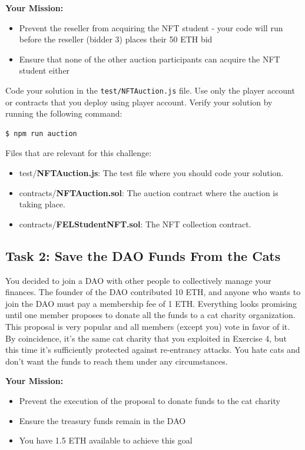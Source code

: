 \documentclass[12pt]{article}
\begin{document}
\medskip
\noindent
\textbf{Your Mission:}
\begin{itemize}
    \item Prevent the reseller from acquiring the NFT student - your code will run before the reseller (bidder 3) places their 50 ETH bid
    \item Ensure that none of the other auction participants can acquire the NFT student either
\end{itemize}

\noindent
Code your solution in the \texttt{test/NFTAuction.js} file. Use only the player account or contracts that you deploy using player account. Verify your solution by running the following command:

\begin{verbatim}
$ npm run auction
\end{verbatim}

\noindent
Files that are relevant for this challenge:
\begin{itemize}
\item test/\textbf{NFTAuction.js}: The test file where you should code your solution.
\item contracts/\textbf{NFTAuction.sol}: The auction contract where the auction is taking place.
\item contracts/\textbf{FELStudentNFT.sol}: The NFT collection contract.
\end{itemize}

\subsection*{Task 2: Save the DAO Funds From the Cats}

You decided to join a DAO with other people to collectively manage your finances. The founder of the DAO contributed 10 ETH, and anyone who wants to join the DAO must pay a membership fee of 1 ETH. Everything looks promising until one member proposes to donate all the funds to a cat charity organization. This proposal is very popular and all members (except you) vote in favor of it. By coincidence, it's the same cat charity that you exploited in Exercise 4, but this time it's sufficiently protected against re-entrancy attacks. You hate cats and don't want the funds to reach them under any circumstances.

\medskip
\noindent
\textbf{Your Mission:}
\begin{itemize}
  \item Prevent the execution of the proposal to donate funds to the cat charity
  \item Ensure the treasury funds remain in the DAO
  \item You have 1.5 ETH available to achieve this goal
\end{itemize}
\end{document}
